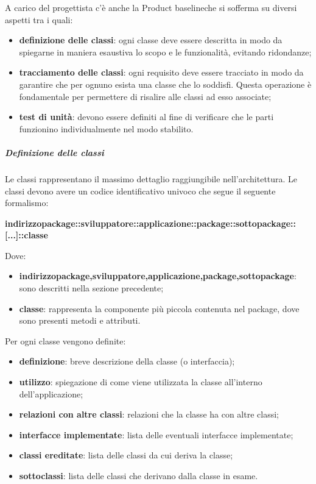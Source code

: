 \begin{itemize}
			A carico del progettista c'è anche la Product baseline\glosp che si sofferma su diversi aspetti tra i quali:
			\begin{itemize}
				\item \textbf{definizione delle classi}: ogni classe deve essere descritta in modo da spiegarne in maniera esaustiva lo scopo e le funzionalità, evitando ridondanze;
				\item \textbf{tracciamento delle classi}: ogni requisito deve essere tracciato in modo da garantire che per ognuno esista una classe che lo soddisfi. Questa operazione è fondamentale per permettere di risalire alle classi ad esso associate;
				\item \textbf{test di unità}: devono essere definiti al fine di verificare che le parti funzionino individualmente nel modo stabilito.
				\end{itemize}
				\subparagraph{Definizione delle classi}
			Le classi rappresentano il massimo dettaglio raggiungibile nell'architettura. Le classi devono avere un codice identificativo univoco che segue il seguente formalismo:\newline
			\centerline{\textbf{indirizzo\textunderscore package::sviluppatore::applicazione::package::sottopackage::[...]::classe}}\newline
			Dove:
			\begin{itemize}
			\item \textbf{indirizzo\textunderscore package,sviluppatore,applicazione,package,sottopackage}: sono descritti nella sezione precedente;
			\item \textbf{classe}: rappresenta la componente più piccola contenuta nel package, dove sono presenti metodi e attributi.
			\end{itemize}
			Per ogni classe vengono definite:
			\begin{itemize}
			\item \textbf{definizione}: breve descrizione della classe (o interfaccia);
			\item \textbf{utilizzo}: spiegazione di come viene utilizzata la classe all'interno dell'applicazione;
			\item \textbf{relazioni con altre classi}: relazioni che la classe ha con altre classi;
			\item \textbf{interfacce implementate}: lista delle eventuali interfacce implementate;
			\item \textbf{classi ereditate}: lista delle classi da cui deriva la classe;
			\item \textbf{sottoclassi}: lista delle classi che derivano dalla classe in esame.
			\end{itemize}
			\end{itemize}
								
